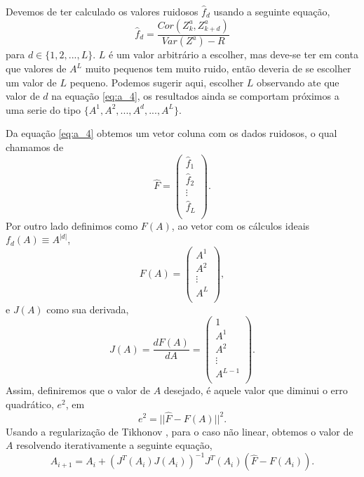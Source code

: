 \documentclass[a4paper,10pt]{article}
\begin{document}
Devemos de ter calculado os valores  ruidosos $\hat{f}_d$ usando a seguinte equação,
\begin{equation} \label{eq:a_4}
\hat{f}_d=\frac{Cor(Z^a_k,Z^a_{k+d})}{Var(Z^a) -  R}
\end{equation} 
para $d \in \{1, 2, ..., L\}$.
$L$ é um valor arbitrário a escolher, mas deve-se ter em conta que valores de $A^L$
muito pequenos tem muito ruido, então deveria de se escolher um valor de $L$
pequeno. Podemos sugerir aqui, escolher $L$ observando ate que valor de $d$ na
equação \eqref{eq:a_4}, os resultados ainda se comportam próximos a uma 
serie do tipo $\{A^1, A^2, ..., A^d, ..., A^L \}$.

Da equação \eqref{eq:a_4} obtemos um vetor coluna com os dados ruidosos, o qual chamamos de
\begin{equation} \label{eq:t0}
\hat{F}=\left(
\begin{matrix}
 \hat{f}_1\\
 \hat{f}_2\\
 \vdots\\
 \hat{f}_L\\
\end{matrix}\right).
\end{equation}
Por outro lado definimos como $F(A)$, ao vetor com os cálculos ideais $f_d(A)\equiv A^{|d|}$,
\begin{equation} \label{eq:t1}
F(A)=\left(
\begin{matrix}
 A^1\\
 A^2\\
 \vdots\\
 A^L\\
\end{matrix}\right),
\end{equation} 
e $J(A)$ como sua derivada,
\begin{equation} \label{eq:t5}
 J(A)=\frac{dF(A)}{dA}=\left(
\begin{matrix}
 1\\
 A^1\\
 A^2\\
 \vdots\\
 A^{L-1}\\
\end{matrix}\right).
\end{equation}
Assim, definiremos que o valor de $A$ desejado, é aquele valor que diminui o erro quadrático, $e^2$, em
\begin{equation} \label{eq:t3}
 e^2 = || \hat{F} - F(A) ||^2.
\end{equation}
Usando a regularização de Tikhonov \cite{shobha2014newton,doicu2002iteratively,tichonov1992ill}, para o caso não linear,
obtemos o valor de $A$ resolvendo iterativamente a seguinte 
equação,
\begin{equation} \label{eq:t4}
 A_{i+1}=A_{i}+ \left( J^T(A_{i}) J(A_{i})\right)^{-1} J^T(A_{i}) \left(\hat{F}-F(A_{i}) \right).
\end{equation}
\end{document}

